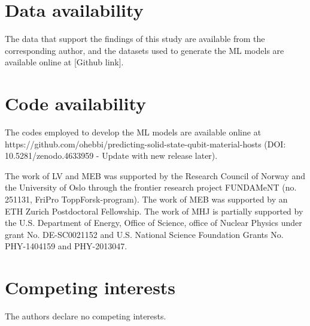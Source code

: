 \documentclass[superscriptaddress,unsortedaddress,
 amsmath,amssymb,
 aps,
]{revtex4-2}
\begin{document}
\section*{Data availability} 

The data that support the findings of this study are available from the corresponding author, and the datasets used to generate the ML models are available online at [Github link]. 

\section*{Code availability} 
The codes employed to develop the ML models are available online at https://github.com/ohebbi/predicting-solid-state-qubit-material-hosts (DOI: 10.5281/zenodo.4633959 - Update with new release later). %


\begin{acknowledgments}

The work of LV and MEB was supported by the Research Council of Norway and the University of Oslo through the frontier research project FUNDAMeNT (no. 251131, FriPro ToppForsk-program). 
The work of MEB was supported by an ETH Zurich Postdoctoral Fellowship. 
The work of MHJ is partially supported by the U.S. Department of Energy,
Office of Science, office of Nuclear Physics under grant
No. DE-SC0021152 and U.S. National Science Foundation Grants
No. PHY-1404159 and PHY-2013047. 


\end{acknowledgments}


\section*{Competing interests}
The authors declare no competing interests.
\end{document}
